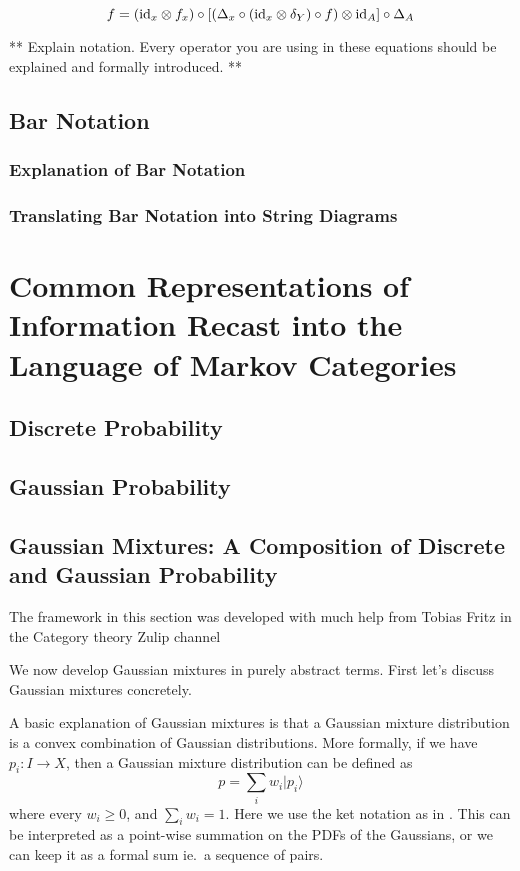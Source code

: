 \begin{equation}
\label{eq:conditional-parallel-compositions}
f = (\mathrm{id}_x \otimes f_x) \circ \left[\left(\Delta_x \circ (\mathrm{id}_x\otimes \delta_Y) \circ f\right) \otimes \mathrm{id}_A\right] \circ \Delta_A
\end{equation}

** Explain notation. Every operator you are using in these equations should be explained and formally introduced. **

\section{Bar Notation}
\subsection{Explanation of Bar Notation}
\subsection{Translating Bar Notation into String Diagrams}

\chapter{Common Representations of Information Recast into the Language of Markov Categories}
\section{Discrete Probability}
\section{Gaussian Probability}
\section{Gaussian Mixtures: A Composition of Discrete and Gaussian Probability}

The framework in this section was developed with much help from Tobias Fritz in the Category theory Zulip channel \cite{zulip}

We now develop Gaussian mixtures in purely abstract terms.
First let's discuss Gaussian mixtures concretely.

A basic explanation of Gaussian mixtures is that a Gaussian mixture distribution is a convex combination of Gaussian distributions.
More formally, if we have $p_i: I\rightarrow X$, then a Gaussian mixture distribution can be defined as
\begin{equation}
    p = \sum_i w_i | p_i \rangle
\end{equation}
where every $w_i \geq 0$, and $\sum_i w_i = 1$.
Here we use the ket notation as in \cite{cho-jacobs}.
This can be interpreted as a point-wise summation on the PDFs of the Gaussians, or we can keep it as a formal sum ie.\ a sequence of pairs.

